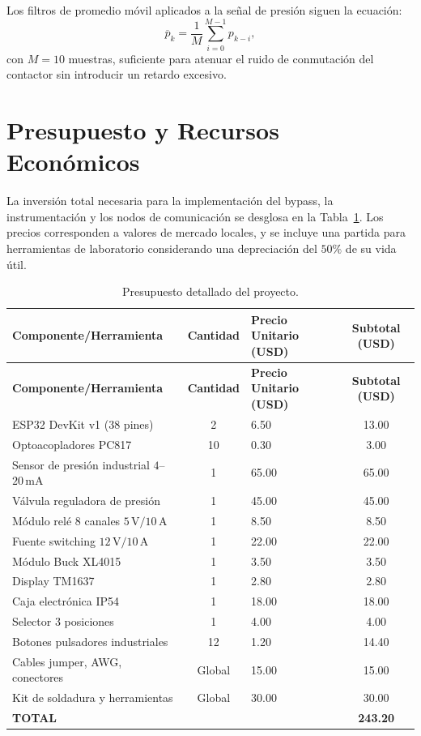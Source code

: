 Los filtros de promedio móvil aplicados a la señal de presión siguen la ecuación:
\begin{equation}
    \overline{p}_k = \frac{1}{M} \sum_{i=0}^{M-1} p_{k-i},
\end{equation}
con \(M=10\) muestras, suficiente para atenuar el ruido de conmutación del contactor sin introducir un retardo excesivo.

\section{Presupuesto y Recursos Económicos}
La inversión total necesaria para la implementación del bypass, la instrumentación y los nodos de comunicación se desglosa en la Tabla~\ref{tab:presupuesto}. Los precios corresponden a valores de mercado locales, y se incluye una partida para herramientas de laboratorio considerando una depreciación del $50\%$ de su vida útil.

\begin{longtable}{|p{6.5cm}|c|p{2cm}|c|}
\caption{Presupuesto detallado del proyecto.}
\label{tab:presupuesto}\\
\hline
\textbf{Componente/Herramienta} & \textbf{Cantidad} & \textbf{Precio Unitario (USD)} & \textbf{Subtotal (USD)} \\
\hline
\endfirsthead
\hline
\textbf{Componente/Herramienta} & \textbf{Cantidad} & \textbf{Precio Unitario (USD)} & \textbf{Subtotal (USD)} \\
\hline
\endhead
\hline
\endlastfoot
ESP32 DevKit v1 (38 pines) & 2 & 6.50 & 13.00 \\
Optoacopladores PC817 & 10 & 0.30 & 3.00 \\
Sensor de presión industrial $4$–$20\,\text{mA}$ & 1 & 65.00 & 65.00 \\
Válvula reguladora de presión & 1 & 45.00 & 45.00 \\
Módulo relé 8 canales $5\,\text{V}/10\,\text{A}$ & 1 & 8.50 & 8.50 \\
Fuente switching $12\,\text{V}/10\,\text{A}$ & 1 & 22.00 & 22.00 \\
Módulo Buck XL4015 & 1 & 3.50 & 3.50 \\
Display TM1637 & 1 & 2.80 & 2.80 \\
Caja electrónica IP54 & 1 & 18.00 & 18.00 \\
Selector 3 posiciones & 1 & 4.00 & 4.00 \\
Botones pulsadores industriales & 12 & 1.20 & 14.40 \\
Cables jumper, AWG, conectores & Global & 15.00 & 15.00 \\
Kit de soldadura y herramientas & Global & 30.00 & 30.00 \\
\hline
\textbf{TOTAL} & & & \textbf{243.20} \\
\hline
\end{longtable}

